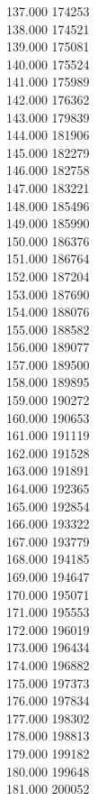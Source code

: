 { 137.000	174253 \\
 138.000	174521 \\
 139.000	175081 \\
 140.000	175524 \\
 141.000	175989 \\
 142.000	176362 \\
 143.000	179839 \\
 144.000	181906 \\
 145.000	182279 \\
 146.000	182758 \\
 147.000	183221 \\
 148.000	185496 \\
 149.000	185990 \\
 150.000	186376 \\
 151.000	186764 \\
 152.000	187204 \\
 153.000	187690 \\
 154.000	188076 \\
 155.000	188582 \\
 156.000	189077 \\
 157.000	189500 \\
 158.000	189895 \\
 159.000	190272 \\
 160.000	190653 \\
 161.000	191119 \\
 162.000	191528 \\
 163.000	191891 \\
 164.000	192365 \\
 165.000	192854 \\
 166.000	193322 \\
 167.000	193779 \\
 168.000	194185 \\
 169.000	194647 \\
 170.000	195071 \\
 171.000	195553 \\
 172.000	196019 \\
 173.000	196434 \\
 174.000	196882 \\
 175.000	197373 \\
 176.000	197834 \\
 177.000	198302 \\
 178.000	198813 \\
 179.000	199182 \\
 180.000	199648 \\
 181.000	200052 \\
}
